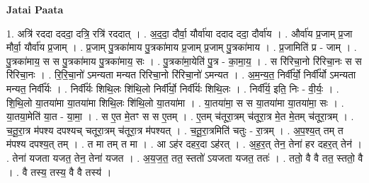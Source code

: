 \documentclass[17pt]{extarticle}
\begin{document}
\textbf{Jatai Paata} \newline

1. अत्रि॑ रददा दददा॒ दत्रि॒ रत्रि॑ रददात् । . अ॒द॒दा॒ दौर्वा॒ यौर्वा॑या ददाद ददा॒ दौर्वा॑य । . और्वा॑य प्र॒जाम् प्र॒जा मौर्वा॒ यौर्वा॑य प्र॒जाम् । . प्र॒जाम् पु॒त्रका॑माय पु॒त्रका॑माय प्र॒जाम् प्र॒जाम् पु॒त्रका॑माय । . प्र॒जामिति॑ प्र - जाम् । . पु॒त्रका॑माय॒ स स पु॒त्रका॑माय पु॒त्रका॑माय॒ सः । . पु॒त्रका॑मा॒येति॑ पु॒त्र - का॒मा॒य॒ । . स रि॑रिचा॒नो रि॑रिचा॒नः स स रि॑रिचा॒नः । . रि॒रि॒चा॒नो॑ ऽमन्यता मन्यत रिरिचा॒नो रि॑रिचा॒नो॑ ऽमन्यत । . अ॒म॒न्य॒त॒ निर्वी᳚र्यो॒ निर्वी᳚र्यो ऽमन्यता मन्यत॒ निर्वी᳚र्यः । . निर्वी᳚र्यः शिथि॒लः शि॑थि॒लो निर्वी᳚र्यो॒ निर्वी᳚र्यः शिथि॒लः । . निर्वी᳚र्य॒ इति॒ निः - वी॒र्यः॒ । . शि॒थि॒लो या॒तया॑मा या॒तया॑मा शिथि॒लः शि॑थि॒लो या॒तया॑मा । . या॒तया॑मा॒ स स या॒तया॑मा या॒तया॑मा॒ सः । . या॒तया॒मेति॑ या॒त - या॒मा॒ । . स ए॒त मे॒तꣳ स स ए॒तम् । . ए॒तम् च॑तूरा॒त्रम् च॑तूरा॒त्र मे॒त मे॒तम् च॑तूरा॒त्रम् । . च॒तू॒रा॒त्र म॑पश्य दपश्यच् चतूरा॒त्रम् च॑तूरा॒त्र म॑पश्यत् । . च॒तू॒रा॒त्रमिति॑ चतुः - रा॒त्रम् । . अ॒प॒श्य॒त् तम् त म॑पश्य दपश्य॒त् तम् । . त मा तम् त मा । . आ ऽह॑र दहर॒दा ऽह॑रत् । . अ॒ह॒र॒त् तेन॒ तेना॑ हर दहर॒त् तेन॑ । . तेना॑ यजता यजत॒ तेन॒ तेना॑ यजत । . अ॒य॒ज॒त॒ तत॒ स्ततो॑ ऽयजता यजत॒ ततः॑ । . ततो॒ वै वै तत॒ स्ततो॒ वै । . वै तस्य॒ तस्य॒ वै वै तस्य॑ । \newline
\end{document}
